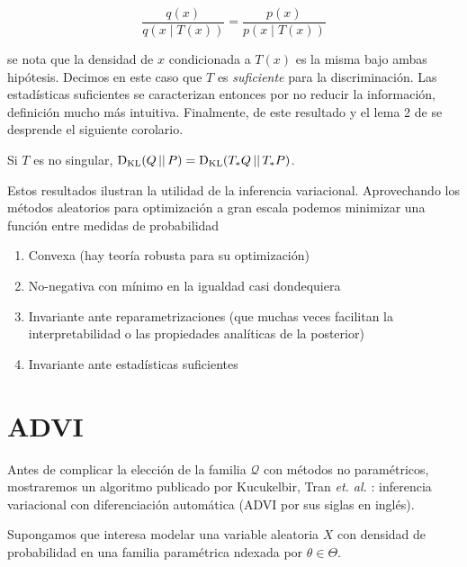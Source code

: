 \documentclass[main.tex]{subfiles}
\begin{document}
\begin{equation*}
	\frac{q(x)}{q(x\mid T(x))} = \frac{p(x)}{p(x\mid T(x))}
\end{equation*}

se nota que la densidad de $x$ condicionada a $T(x)$ es la misma bajo ambas hipótesis. Decimos en este caso que $T$ es \textit{suficiente} para la discriminación. Las estadísticas suficientes se caracterizan entonces por no reducir la información, definición mucho más intuitiva. Finalmente, de este resultado y el lema 2 de \cite{halmos1949} se desprende el siguiente corolario.

\begin{corollary}
	Si $T$ es no singular, $\operatorname*{D_{KL}}(Q \operatorname*{\mid\mid} P) = \operatorname*{D_{KL}}(T_*Q \operatorname*{\mid\mid} T_*P)$. 
\end{corollary}

Estos resultados ilustran la utilidad de la inferencia variacional. Aprovechando los métodos aleatorios para optimización a gran escala podemos minimizar una función entre medidas de probabilidad
\begin{enumerate}[label=\roman*.]
	\item Convexa (hay teoría robusta para su optimización)
	\item No-negativa con mínimo en la igualdad casi dondequiera
	\item Invariante ante reparametrizaciones (que muchas veces facilitan la interpretabilidad o las propiedades analíticas de la posterior)
	\item Invariante ante estadísticas suficientes
\end{enumerate}

\section{ADVI}\label{sec:advi}
Antes de complicar la elección de la familia $\mathcal{Q}$ con métodos no paramétricos, mostraremos un algoritmo publicado por Kucukelbir, Tran \textit{et. al.} \cite{advi}: inferencia variacional con diferenciación automática (ADVI por sus siglas en inglés). 

 Supongamos que interesa modelar una variable aleatoria $X$ con densidad de probabilidad en una familia paramétrica ndexada por $\theta \in \Theta$. 
\end{document}

